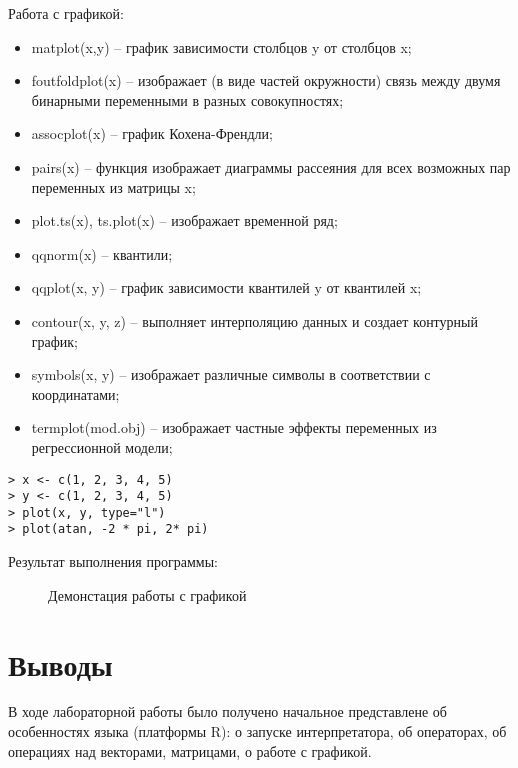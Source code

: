 \documentclass[a4paper,14pt]{extarticle}
\begin{document}
Работа с графикой:
\begin{itemize}
    \item matplot(x,y) – график зависимости столбцов y от столбцов x;
    \item foutfoldplot(x) – изображает (в виде частей окружности) связь между
          двумя бинарными переменными в разных совокупностях;
    \item assocplot(x) – график Кохена-Френдли;
    \item pairs(x) – функция изображает диаграммы рассеяния для всех возможных
          пар переменных из матрицы x;
    \item plot.ts(x), ts.plot(x) – изображает временной ряд;
    \item qqnorm(x) – квантили;
    \item qqplot(x, y) – график зависимости квантилей y от квантилей x;
    \item contour(x, y, z) – выполняет интерполяцию данных и создает контурный
          график;
    \item symbols(x, y) – изображает различные символы в соответствии с
          координатами;
    \item termplot(mod.obj) – изображает частные эффекты переменных из
          регрессионной модели;
\end{itemize}

\begin{lstlisting}
> x <- c(1, 2, 3, 4, 5)
> y <- c(1, 2, 3, 4, 5)
> plot(x, y, type="l")
> plot(atan, -2 * pi, 2* pi)
\end{lstlisting}

Результат выполнения программы:
\begin{figure}[H]
    \centering
    \subfloat[y = x]{\texttt{[image: y=x]}}
    \hspace{.15\linewidth}
    \caption{Демонстация работы с графикой}
\end{figure}

\section*{Выводы}
В ходе лабораторной работы было получено начальное представлене об особенностях
языка (платформы R): о запуске интерпретатора, об операторах, об операциях над
векторами, матрицами, о работе с графикой.
\end{document}
